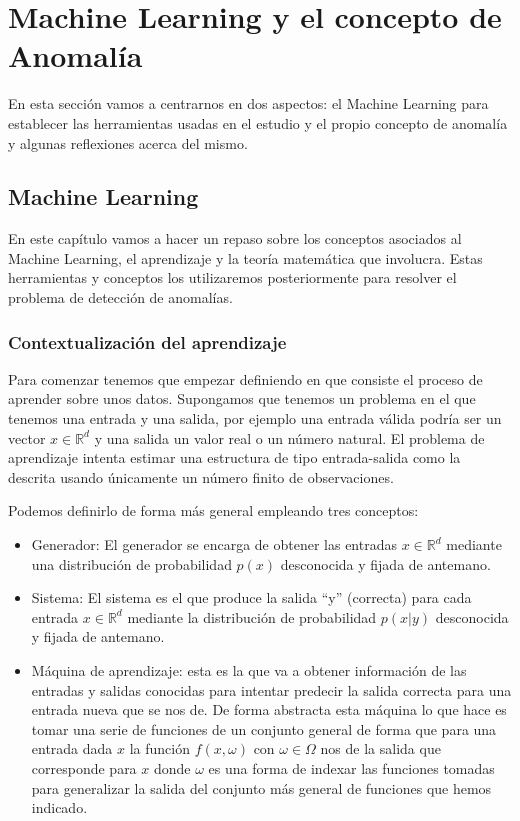 \part{Machine Learning y el concepto de Anomalía}
\label{part:machineLearning_anomalia}

En esta sección vamos a centrarnos en dos aspectos: el Machine Learning para establecer las herramientas usadas en el estudio y el propio concepto de anomalía y algunas reflexiones acerca del mismo.

\chapter{Machine Learning}
\label{chapter:machine_learning}

En este capítulo vamos a hacer un repaso sobre los conceptos asociados al Machine Learning, el aprendizaje y la teoría matemática que involucra. Estas herramientas y conceptos los utilizaremos posteriormente para resolver el problema de detección de anomalías.

\section{Contextualización del aprendizaje}

Para comenzar tenemos que empezar definiendo en que consiste el proceso de aprender sobre unos datos. Supongamos que tenemos un problema en el que tenemos una entrada y una salida, por ejemplo una entrada válida podría ser un vector $x\in \mathbb{R}^d$ y una salida un valor real o un número natural. El problema de aprendizaje intenta estimar una estructura de tipo entrada-salida como la descrita usando únicamente un número finito de observaciones.

Podemos definirlo de forma más general empleando tres conceptos:

\begin{itemize}
	\item Generador: El generador se encarga de obtener las entradas $x\in \mathbb{R}^d$ mediante una distribución de probabilidad $p(x)$ desconocida y fijada de antemano.
	\item Sistema: El sistema es el que produce la salida ``y'' (correcta) para cada entrada $x\in \mathbb{R}^d$ mediante la distribución de probabilidad $p(x|y)$ desconocida y fijada de antemano.
	\item Máquina de aprendizaje: esta es la que va a obtener información de las entradas y salidas conocidas para intentar predecir la salida correcta para una entrada nueva que se nos de. De forma abstracta esta máquina lo que hace es tomar una serie de funciones de un conjunto general de forma que para una entrada dada $x$ la función $f(x,\omega)$ con $\omega \in \Omega$ nos de la salida que corresponde para $x$ donde $\omega$ es una forma de indexar las funciones tomadas para generalizar la salida del conjunto más general de funciones que hemos indicado.
\end{itemize}

